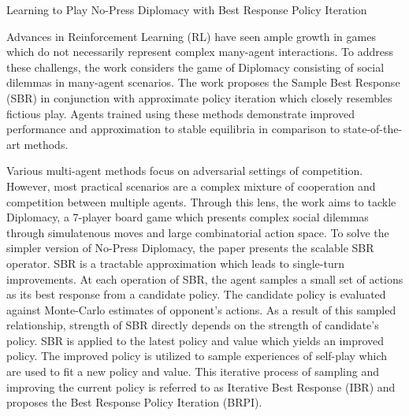 \documentclass[11pt,letterpaper]{article}
\begin{document}
\begin{center}
  \large{Learning to Play No-Press Diplomacy
  with Best Response Policy Iteration}
\end{center}

Advances in Reinforcement Learning (RL) have seen ample growth in games which do not necessarily represent complex many-agent interactions. To address these challengs, the work considers the game of Diplomacy consisting of social dilemmas in many-agent scenarios. The work proposes the Sample Best Response (SBR) in conjunction with approximate policy iteration which closely resembles fictious play. Agents trained using these methods demonstrate improved performance and approximation to stable equilibria in comparison to state-of-the-art methods. 

Various multi-agent methods focus on adversarial settings of competition. However, most practical scenarios are a complex mixture of cooperation and competition between multiple agents. Through this lens, the work aims to tackle Diplomacy, a 7-player board game which presents complex social dilemmas through simulatenous moves and large combinatorial action space. To solve the simpler version of No-Press Diplomacy, the paper presents the scalable SBR operator. SBR is a tractable approximation which leads to single-turn improvements. At each operation of SBR, the agent samples a small set of actions as its best response from a candidate policy. The candidate policy is evaluated against Monte-Carlo estimates of opponent's actions. As a result of this sampled relationship, strength of SBR directly depends on the strength of candidate's policy. SBR is applied to the latest policy and value which yields an improved policy. The improved policy is utilized to sample experiences of self-play which are used to fit a new policy and value. This iterative process of sampling and improving the current policy is referred to as Iterative Best Response (IBR) and proposes the Best Response Policy Iteration (BRPI). 
\end{document}

